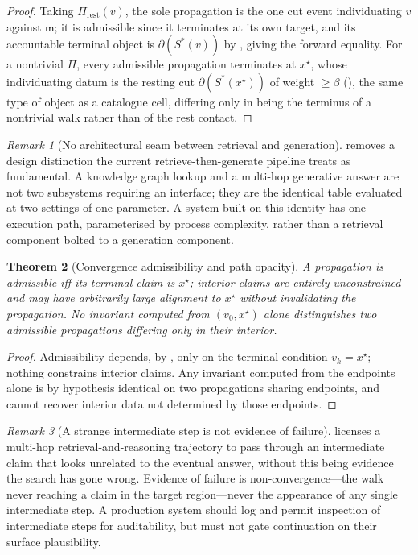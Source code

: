 \documentclass[11pt,twocolumn,a4paper]{article}
\theoremstyle{frathm}
\newtheorem{theorem}{Theorem}[section]
\theoremstyle{definition}
\theoremstyle{remark}
\newtheorem{remark}[theorem]{Remark}
\newcommand{\med}{\mathsf{m}}
\newcommand{\flo}{\beta}
\newcommand{\cut}{\partial}
\newcommand{\Proc}{\Pi}
\begin{document}
\begin{proof}
Taking $\Proc_{\mathrm{rest}}(v)$, the sole propagation is the one cut
event individuating $v$ against $\med$; it is admissible since it
terminates at its own target, and its accountable terminal object is
$\cut(S^{\ast}(v))$ by , giving the forward equality. For
a nontrivial $\Proc$, every admissible propagation terminates at
$x^{\star}$, whose individuating datum is the resting cut
$\cut(S^{\ast}(x^{\star}))$ of weight $\ge\flo$ (), the
same type of object as a catalogue cell, differing only in being the
terminus of a nontrivial walk rather than of the rest contact.
\end{proof}

\begin{remark}[No architectural seam between retrieval and generation]
\label{rem:no-seam}
 removes a design distinction the current
retrieve-then-generate pipeline treats as fundamental. A knowledge graph
lookup and a multi-hop generative answer are not two subsystems requiring
an interface; they are the identical table evaluated at two settings of
one parameter. A system built on this identity has one execution path,
parameterised by process complexity, rather than a retrieval component
bolted to a generation component.
\end{remark}

\begin{theorem}[Convergence admissibility and path opacity]
\label{thm:path-opacity}
A propagation is admissible iff its terminal claim is $x^{\star}$;
interior claims are entirely unconstrained and may have arbitrarily large
alignment to $x^{\star}$ without invalidating the propagation. No
invariant computed from $(v_0,x^{\star})$ alone distinguishes two
admissible propagations differing only in their interior.
\end{theorem}

\begin{proof}
Admissibility depends, by , only on the terminal
condition $v_k=x^{\star}$; nothing constrains interior claims. Any
invariant computed from the endpoints alone is by hypothesis identical on
two propagations sharing endpoints, and cannot recover interior data not
determined by those endpoints.
\end{proof}

\begin{remark}[A strange intermediate step is not evidence of failure]
\label{rem:weird-step}
 licenses a multi-hop retrieval-and-reasoning
trajectory to pass through an intermediate claim that looks unrelated to
the eventual answer, without this being evidence the search has gone
wrong. Evidence of failure is non-convergence---the walk never reaching a
claim in the target region---never the appearance of any single
intermediate step. A production system should log and permit
inspection of intermediate steps for auditability, but must not gate
continuation on their surface plausibility.
\end{remark}
\end{document}
